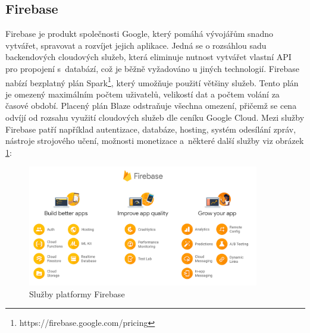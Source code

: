 \documentclass[czech, bc, kiv, he, iso690numb]{fasthesis}
\begin{document}



\subsection{Firebase} \label{lab:firebase}

Firebase je produkt společnosti Google, který pomáhá vývojářům snadno vytvářet, spravovat a rozvíjet jejich aplikace. Jedná se o rozsáhlou sadu backendových cloudových služeb, která eliminuje nutnost vytvářet vlastní \gls{API} pro propojení s~databází, což je běžně vyžadováno u jiných technologií. Firebase nabízí bezplatný plán Spark\footnote{https://firebase.google.com/pricing}, který umožňuje použití většiny služeb. Tento plán je omezený maximálním počtem uživatelů, velikostí dat a počtem volání za časové období. Placený plán Blaze odstraňuje všechna omezení, přičemž se cena odvíjí od rozsahu využití cloudových služeb dle ceníku Google Cloud. Mezi služby Firebase patří například autentizace, databáze, hosting, systém odesílání zpráv, nástroje strojového učení, možnosti monetizace a~některé další služby viz obrázek \ref{fig:firebase-function}: \cite{firebase} \cite{firebase-geeksforgeeks} \cite{firebase-meme}


\begin{figure}[h!]
  \centering
  \includegraphics[width=0.9\textwidth]{img/BP-Runt/Data_storing/Firebase/firebase_features.png}
  \caption{Služby platformy Firebase \cite{firebase-meme}}
  \label{fig:firebase-function}
\end{figure}
\end{document}

